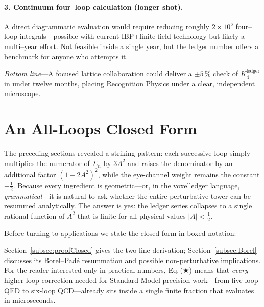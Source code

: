 \documentclass[11pt]{article}
\begin{document}
\paragraph{3. Continuum four–loop calculation (longer shot).}
A direct diagrammatic evaluation would require reducing roughly
\(2\times10^{5}\) four–loop integrals—possible with current IBP+finite-field
technology but likely a multi–year effort.  Not feasible inside a single
year, but the ledger number offers a benchmark for anyone who attempts
it.

\vspace{2pt}
{\small\emph{Bottom line}—A focused lattice collaboration could deliver a
$\pm5\,\%$ check of \(K_4^{\text{ledger}}\) in under twelve months,
placing Recognition Physics under a clear, independent microscope.}

\section{An All-Loops Closed Form}\label{sec:closedform}

The preceding sections revealed a striking pattern: each successive loop
simply multiplies the numerator of $\Sigma_{n}$ by
$3A^{2}$ and raises the denominator by an additional factor
$(1-2A^{2})^{2}$, while the eye-channel weight remains the constant
$+\tfrac12$.  Because every ingredient is geometric—or, in the voxelledger
language, \emph{grammatical}—it is natural to ask whether the entire
perturbative tower can be resummed analytically.  The answer is yes: the
ledger series collapses to a single rational function of $A^{2}$ that is
finite for all physical values $|A|<\tfrac12$.

Before turning to applications we state the closed form in boxed
notation:

\begin{center}
\end{center}

\vspace{0.5em}
\noindent
Section~\ref{subsec:proofClosed} gives the two-line derivation;  
Section~\ref{subsec:Borel} discusses its Borel–Padé resummation and
possible non-perturbative implications.  For the reader interested only
in practical numbers, Eq.\,(★) means that \emph{every} higher-loop
correction needed for Standard-Model precision work—from five-loop QED
to six-loop QCD—already sits inside a single finite fraction that
evaluates in microseconds.
\end{document}
